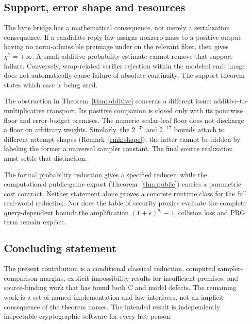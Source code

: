 \subsection{Support, error shape and resources}
The byte bridge has a mathematical consequence, not merely a
serialization consequence. If a candidate reply law assigns nonzero
mass to a positive output having no norm-admissible preimage under
 on the relevant fiber, then
 gives $\chi^2=+\infty$.
A small additive probability estimate cannot remove that support
failure. Conversely, wrap-related verifier rejection within the
modeled emit image does not automatically cause failure of absolute
continuity. The support theorem states which case is being used.

The obstruction in Theorem~\ref{thm:additive} concerns a different issue:
additive-to-multiplicative transport. Its positive companion is closed only with its
pointwise floor and error-budget premises. The numeric scalar-leaf
floor does not discharge a floor on arbitrary weights. Similarly,
the $2^{-32}$ and $2^{-17}$ bounds attach to different attempt shapes
(Remark~\ref{rmk:shape});
the latter cannot be hidden by labeling the former a universal sampler
constant. The final source realization must settle that distinction.

The formal probability reduction gives a specified reducer, while the
computational public-game export (Theorem~\ref{thm:public}) carries a
parametric cost contract.
Neither statement alone proves a concrete runtime class for the full
real-world reduction. Nor does the table of security proxies evaluate
the complete query-dependent bound: the amplification
$(1+e)^{q_s}-1$, collision loss and PRG term remain explicit.


\subsection{Concluding statement}
The present contribution is a conditional classical reduction, computed
sampler-comparison margins, explicit impossibility results for insufficient
premises, and source-binding work that has found both C and model defects.
The remaining work is a set of named implementation and law interfaces,
not an implicit consequence of the theorem names. The intended result
is independently inspectable cryptographic software for every free person.
